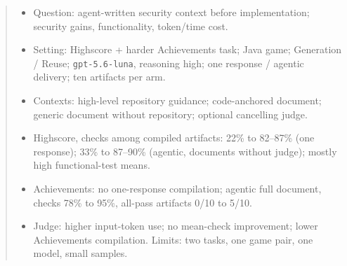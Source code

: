 \begin{abstract}
\begin{itemize}
\item Question: agent-written security context before implementation;
security gains, functionality, token/time cost.
\item Setting: Highscore + harder Achievements task; Java game;
Generation / Reuse; \texttt{gpt-5.6-luna}, reasoning high;
one response / agentic delivery; ten artifacts per arm.
\item Contexts: high-level repository guidance; code-anchored document;
generic document without repository; optional cancelling judge.
\item Highscore, checks among compiled artifacts: 22\% to 82--87\%
(one response); 33\% to 87--90\% (agentic, documents without judge);
mostly high functional-test means.
\item Achievements: no one-response compilation; agentic full document,
checks 78\% to 95\%, all-pass artifacts 0/10 to 5/10.
\item Judge: higher input-token use; no mean-check improvement;
lower Achievements compilation. Limits: two tasks, one game pair,
one model, small samples.
\end{itemize}
\end{abstract}
